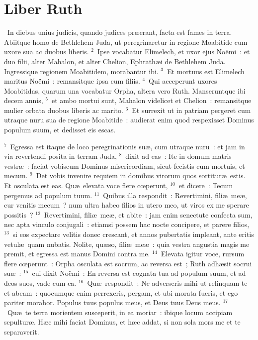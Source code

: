 {\centering \section*{Liber Ruth}}\thispagestyle{empty}

~\lettrine[lines=10,image=true,loversize=0.05,lraise=-0.03]{I}{}n diebus unius judicis, quando judices pr\ae erant, facta est fames in terra. Abiitque homo de Bethlehem Juda, ut peregrinaretur in regione Moabitide cum uxore sua ac duobus liberis.
${}^{2}$~Ipse vocabatur Elimelech, et uxor ejus No\"emi~: et duo filii, alter Mahalon, et alter Chelion, Ephrath\ae i de Bethlehem Juda. Ingressique regionem Moabitidem, morabantur ibi.
${}^{3}$~Et mortuus est Elimelech maritus No\"emi~: remansitque ipsa cum filiis.
${}^{4}$~Qui acceperunt uxores Moabitidas, quarum una vocabatur Orpha, altera vero Ruth. Manseruntque ibi decem annis,
${}^{5}$~et ambo mortui sunt, Mahalon videlicet et Chelion~: remansitque mulier orbata duobus liberis ac marito.
${}^{6}$~Et surrexit ut in patriam pergeret cum utraque nuru sua de regione Moabitide~: audierat enim quod respexisset Dominus populum suum, et dedisset eis escas.


${}^{7}$~Egressa est itaque de loco peregrinationis su\ae , cum utraque nuru~: et jam in via revertendi posita in terram Juda,
${}^{8}$~dixit ad eas~: Ite in domum matris vestr\ae~: faciat vobiscum Dominus misericordiam, sicut fecistis cum mortuis, et mecum.
${}^{9}$~Det vobis invenire requiem in domibus virorum quos sortitur\ae\ estis. Et osculata est eas. Qu\ae\ elevata voce flere cœperunt,
${}^{10}$~et dicere~: Tecum pergemus ad populum tuum.
${}^{11}$~Quibus illa respondit~: Revertimini, fili\ae\ me\ae , cur venitis mecum~? num ultra habeo filios in utero meo, ut viros ex me sperare possitis~?
${}^{12}$~Revertimini, fili\ae\ me\ae , et abite~: jam enim senectute confecta sum, nec apta vinculo conjugali~: etiamsi possem hac nocte concipere, et parere filios,
${}^{13}$~si eos expectare velitis donec crescant, et annos pubertatis impleant, ante eritis vetul\ae\ quam nubatis. Nolite, qu\ae so, fili\ae\ me\ae~: quia vestra angustia magis me premit, et egressa est manus Domini contra me.
${}^{14}$~Elevata igitur voce, rursum flere cœperunt~: Orpha osculata est socrum, ac reversa est~; Ruth adh\ae sit socrui su\ae~:
${}^{15}$~cui dixit No\"emi~: En reversa est cognata tua ad populum suum, et ad deos suos, vade cum ea.
${}^{16}$~Qu\ae\ respondit~: Ne adverseris mihi ut relinquam te et abeam~: quocumque enim perrexeris, pergam, et ubi morata fueris, et ego pariter morabor. Populus tuus populus meus, et Deus tuus Deus meus.
${}^{17}$~Qu\ae\ te terra morientem susceperit, in ea moriar~: ibique locum accipiam sepultur\ae . H\ae c mihi faciat Dominus, et h\ae c addat, si non sola mors me et te separaverit.


